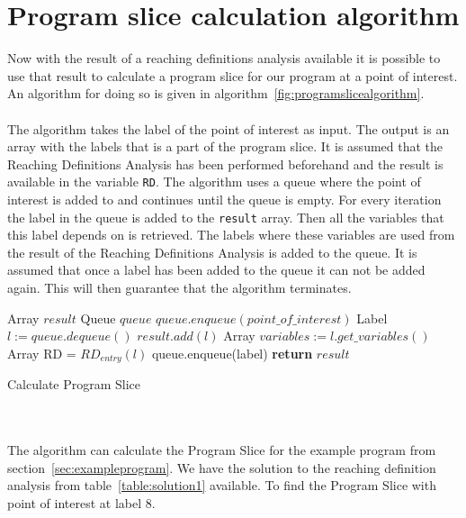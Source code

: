 \section{Program slice calculation algorithm}
Now with the result of a reaching definitions analysis available it is possible to use that result to calculate a program slice for our program at a point of interest. An algorithm for doing so is given in algorithm~\ref{fig:programslicealgorithm}.
\\
\\
The algorithm takes the label of the point of interest as input. The output is an array with the labels that is a part of the program slice. It is assumed that the Reaching Definitions Analysis has been performed beforehand and the result is available in the variable \texttt{RD}. The algorithm uses a queue where the point of interest is added to and continues until the queue is empty. For every iteration the label in the queue is added to the \texttt{result} array. Then all the variables that this label depends on is retrieved. The labels where these variables are used from the result of the Reaching Definitions Analysis is added to the queue. It is assumed that once a label has been added to the queue it can not be added again. This will then guarantee that the algorithm terminates.
\begin{algorithm}
 \begin{algorithmic}[1]
 \State Array $result$
 \State Queue $queue$
 \State $queue.enqueue(point\_of\_interest)$
 \State Label $l:=queue.dequeue()$
 \State $result.add(l)$
 \State Array $variables:=l.get\_variables()$
 \State Array RD = $RD_{entry}(l)$
\State queue.enqueue(label)
\EndIf 
\EndFor
 \EndWhile
 \State \textbf{return} $result$
 \EndProcedure
 \end{algorithmic}
 \caption{Calculate Program Slice}
 \label{fig:programslicealgorithm}
\end{algorithm}
\\\\
The algorithm can calculate the Program Slice for the example program from section~\ref{sec:exampleprogram}. We have the solution to the reaching definition analysis from table~\ref{table:solution1} available. To find the Program Slice with point of interest at label 8.
